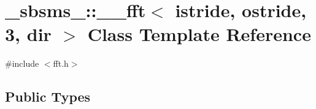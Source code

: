 \hypertarget{class__sbsms___1_1____fft_3_01istride_00_01ostride_00_013_00_01dir_01_4}{}\section{\+\_\+sbsms\+\_\+\+:\+:\+\_\+\+\_\+fft$<$ istride, ostride, 3, dir $>$ Class Template Reference}
\label{class__sbsms___1_1____fft_3_01istride_00_01ostride_00_013_00_01dir_01_4}


{\ttfamily \#include $<$fft.\+h$>$}

\subsection*{Public Types}
